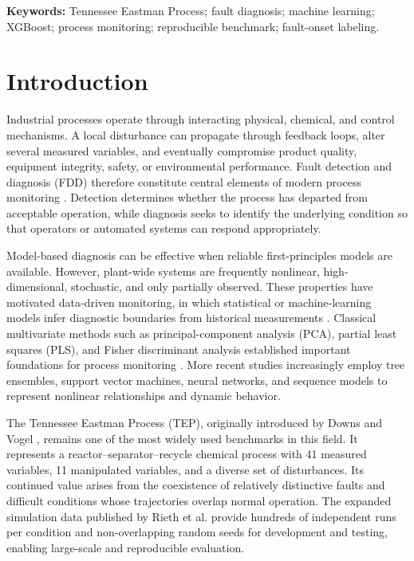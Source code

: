 \documentclass[10pt,twocolumn,a4paper]{article}
\begin{document}
\noindent\textbf{Keywords:} Tennessee Eastman Process; fault diagnosis;
machine learning; XGBoost; process monitoring; reproducible benchmark;
fault-onset labeling.

\section{Introduction}

Industrial processes operate through interacting physical, chemical, and
control mechanisms. A local disturbance can propagate through feedback loops,
alter several measured variables, and eventually compromise product quality,
equipment integrity, safety, or environmental performance. Fault detection and
diagnosis (FDD) therefore constitute central elements of modern process
monitoring \cite{venkatasubramanian2003review,yin2014review,ji2022review}.
Detection determines whether the process has departed from acceptable
operation, while diagnosis seeks to identify the underlying condition so that
operators or automated systems can respond appropriately.

Model-based diagnosis can be effective when reliable first-principles models
are available. However, plant-wide systems are frequently nonlinear,
high-dimensional, stochastic, and only partially observed. These properties
have motivated data-driven monitoring, in which statistical or machine-learning
models infer diagnostic boundaries from historical measurements
\cite{chiang2001book,yin2014review}. Classical multivariate methods such as
principal-component analysis (PCA), partial least squares (PLS), and Fisher
discriminant analysis established important foundations for process monitoring
\cite{chiang2000discriminant}. More recent studies increasingly employ tree
ensembles, support vector machines, neural networks, and sequence models to
represent nonlinear relationships and dynamic behavior.

The Tennessee Eastman Process (TEP), originally introduced by Downs and Vogel
\cite{downs1993tep}, remains one of the most widely used benchmarks in this
field. It represents a reactor--separator--recycle chemical process with 41
measured variables, 11 manipulated variables, and a diverse set of disturbances.
Its continued value arises from the coexistence of relatively distinctive
faults and difficult conditions whose trajectories overlap normal operation.
The expanded simulation data published by Rieth et al. \cite{rieth2017data}
provide hundreds of independent runs per condition and non-overlapping random
seeds for development and testing, enabling large-scale and reproducible
evaluation.
\end{document}
